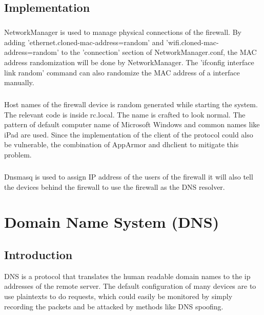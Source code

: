 \documentclass[mscthesis]{usiinfthesis}
\begin{document}

\section{Implementation}
\paragraph{}
NetworkManager is used to manage physical connections of the firewall. By adding 'ethernet.cloned-mac-address=random' and 'wifi.cloned-mac-address=random' to the 'connection' section of NetworkManager.conf, the MAC address randomization will be done by NetworkManager. The 'ifconfig interface link random' command can also randomize the MAC address of a interface manually.
\paragraph{}
Host names of the firewall device is random generated while starting the system. The relevant code is inside rc.local. The name is crafted to look normal. The pattern of default computer name of Microsoft Windows and common names like iPad are used. Since the implementation of the client of the protocol could also be vulnerable, the combination of AppArmor and dhclient to mitigate this problem.
\paragraph{}
Dnsmasq is used to assign IP address of the users of the firewall it will also tell the devices behind the firewall to use the firewall as the DNS resolver.

\chapter{Domain Name System (DNS)}

\section{Introduction}
DNS is a protocol that translates the human readable domain names to the ip addresses of the remote server. The default configuration of many devices are to use plaintexts to do requests, which could easily be monitored by simply recording the packets and be attacked by methods like DNS spoofing.
\end{document}
